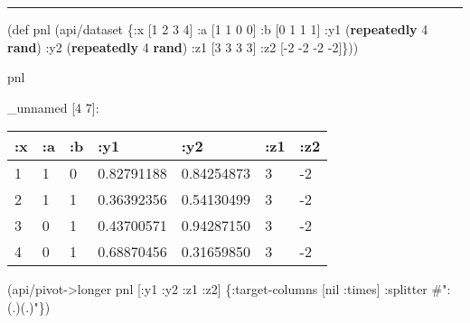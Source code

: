 \documentclass[]{article}
\newenvironment{Shaded}{\begin{snugshade}}{\end{snugshade}}
\newcommand{\AttributeTok}[1]{\textcolor[rgb]{0.77,0.63,0.00}{#1}}
\newcommand{\BuiltInTok}[1]{#1}
\newcommand{\DecValTok}[1]{\textcolor[rgb]{0.00,0.00,0.81}{#1}}
\newcommand{\FunctionTok}[1]{\textcolor[rgb]{0.00,0.00,0.00}{#1}}
\newcommand{\KeywordTok}[1]{\textcolor[rgb]{0.13,0.29,0.53}{\textbf{#1}}}
\newcommand{\NormalTok}[1]{#1}
\newcommand{\SpecialStringTok}[1]{\textcolor[rgb]{0.31,0.60,0.02}{#1}}
\newcommand{\VariableTok}[1]{\textcolor[rgb]{0.00,0.00,0.00}{#1}}
\begin{document}
\begin{center}\rule{0.5\linewidth}{0.5pt}\end{center}

\begin{Shaded}
\begin{Highlighting}[]
\NormalTok{(}\BuiltInTok{def}\FunctionTok{ pnl }\NormalTok{(api/dataset \{}\AttributeTok{:x}\NormalTok{ [}\DecValTok{1} \DecValTok{2} \DecValTok{3} \DecValTok{4}\NormalTok{]}
                       \AttributeTok{:a}\NormalTok{ [}\DecValTok{1} \DecValTok{1} \DecValTok{0} \DecValTok{0}\NormalTok{]}
                       \AttributeTok{:b}\NormalTok{ [}\DecValTok{0} \DecValTok{1} \DecValTok{1} \DecValTok{1}\NormalTok{]}
                       \AttributeTok{:y1}\NormalTok{ (}\KeywordTok{repeatedly} \DecValTok{4} \KeywordTok{rand}\NormalTok{)}
                       \AttributeTok{:y2}\NormalTok{ (}\KeywordTok{repeatedly} \DecValTok{4} \KeywordTok{rand}\NormalTok{)}
                       \AttributeTok{:z1}\NormalTok{ [}\DecValTok{3} \DecValTok{3} \DecValTok{3} \DecValTok{3}\NormalTok{]}
                       \AttributeTok{:z2}\NormalTok{ [-}\DecValTok{2} \DecValTok{-2} \DecValTok{-2} \DecValTok{-2}\NormalTok{]\}))}
\end{Highlighting}
\end{Shaded}

\begin{Shaded}
\begin{Highlighting}[]
\NormalTok{pnl}
\end{Highlighting}
\end{Shaded}

\_unnamed {[}4 7{]}:

\begin{longtable}[]{@{}lllllll@{}}
\toprule
:x & :a & :b & :y1 & :y2 & :z1 & :z2\tabularnewline
\midrule
\endhead
1 & 1 & 0 & 0.82791188 & 0.84254873 & 3 & -2\tabularnewline
2 & 1 & 1 & 0.36392356 & 0.54130499 & 3 & -2\tabularnewline
3 & 0 & 1 & 0.43700571 & 0.94287150 & 3 & -2\tabularnewline
4 & 0 & 1 & 0.68870456 & 0.31659850 & 3 & -2\tabularnewline
\bottomrule
\end{longtable}

\begin{Shaded}
\begin{Highlighting}[]
\NormalTok{(api/pivot->longer pnl [}\AttributeTok{:y1} \AttributeTok{:y2} \AttributeTok{:z1} \AttributeTok{:z2}\NormalTok{] \{}\AttributeTok{:target-columns}\NormalTok{ [}\VariableTok{nil} \AttributeTok{:times}\NormalTok{]}
                                          \AttributeTok{:splitter} \SpecialStringTok{#":(.)(.)"}\NormalTok{\})}
\end{Highlighting}
\end{Shaded}
\end{document}

